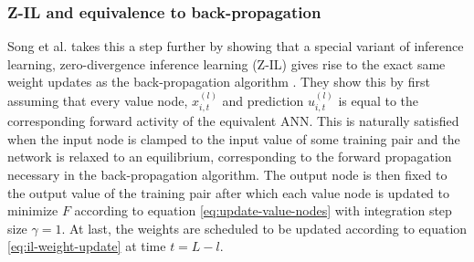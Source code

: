 \documentclass[a4paper,11pt]{article} %
\begin{document}
\subsubsection{Z-IL and equivalence to back-propagation}
Song et al. takes this a step further by showing that a special variant of inference learning, zero-divergence inference learning (Z-IL) gives rise to the exact same weight updates as the back-propagation algorithm \cite{PredictiveCodingNetworks}. They show this by first assuming that every value node, $x_{i,t}^{(l)}$ and prediction $u_{i,t}^{(l)}$ is equal to the corresponding forward activity of the equivalent ANN. This is naturally satisfied when the input node is clamped to the input value of some training pair and the network is relaxed to an equilibrium, corresponding to the forward propagation necessary in the back-propagation algorithm. The output node is then fixed to the output value of the training pair after which each value node is updated to minimize $F$ according to equation \ref{eq:update-value-nodes} with integration step size $\gamma = 1$. At last, the weights are scheduled to be updated according to equation \ref{eq:il-weight-update} at time $t=L-l$.
\end{document}
